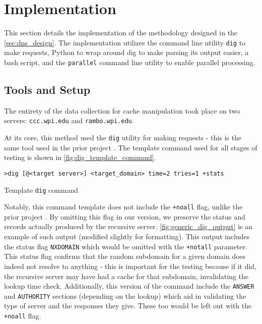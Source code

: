 \section{Implementation}\label{sec:dns_impl} %

This section details the implementation of the methodology designed in the \cref{sec:dns_design}. The implementation utilizes the command line utility \texttt{dig} to make \dns requests, Python to wrap around dig to make parsing its output easier, a bash script, and the \texttt{parallel} command line utility to enable parallel processing.

\subsection{Tools and Setup}

The entirety of the data collection for \dns cache manipulation took place on two \wpi servers: \texttt{ccc.wpi.edu} and \texttt{rambo.wpi.edu}.

At its core, this method used the \texttt{dig} utility for making \dns requests - this is the same tool used in the prior project \cite{Fakult2019}. The template command used for all stages of testing is shown in \cref{fig:dig_template_command}.

\begin{code}[h]
    \centering
    \begin{minipage}{0.85\textwidth}
    \begin{verbatim}
>dig [@<target server>] <target_domain> time=2 tries=1 +stats
    \end{verbatim}
    \end{minipage}
    \caption{Template \texttt{dig} command}
    \label{fig:dig_template_command}
\end{code}

Notably, this command template does not include the \texttt{+noall} flag, unlike the prior project \cite{Fakult2019}. By omitting this flag in our version, we preserve the status and records actually produced by the recursive \dns server. \cref{fig:generic_dig_output} is an example of such output (modified slightly for formatting). This output includes the status flag \texttt{NXDOMAIN} which would be omitted with the \texttt{+notall} parameter. This status flag confirms that the random subdomain for a given domain does indeed not resolve to anything - this is important for the testing because if it did, the recursive server may have had a cache for that subdomain, invalidating the lookup time check. Additionally, this version of the command include the \texttt{ANSWER} and \texttt{AUTHORITY} sections (depending on the lookup) which aid in validating the type of server and the responses they give. These too would be left out with the \texttt{+noall} flag.

